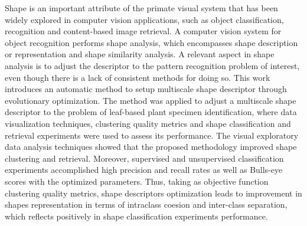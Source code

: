 
Shape is an important attribute of the primate visual system that has been widely explored in computer vision applications, such as object classification, recognition and content-based image retrieval. A computer vision system for object recognition performs shape analysis, which encompasses shape description or representation and shape similarity analysis. A relevant aspect in shape analysis is to adjust the descriptor to the pattern recognition problem of interest, even though there is a lack of consistent methods for doing so.  This work introduces an automatic method to setup multiscale shape descriptor through evolutionary optimization. The method was applied to adjust a multiscale shape descriptor to the problem of leaf-based plant specimen identification, where data visualization techniques, clustering quality metrics and shape classification and retrieval experiments were used to assess its performance. The visual exploratory data analysis techniques showed that the proposed methodology improved shape clustering and retrieval. Moreover, supervised and unsupervised classification experiments accomplished high precision and recall rates as well as Bulls-eye scores with the optimized parameters. Thus, taking as objective function clustering quality metrics, shape descriptors optimization leads to improvement in shapes representation in terms of intraclass coesion and inter-class separation, which reflects positively in shape classification experiments performance.    

